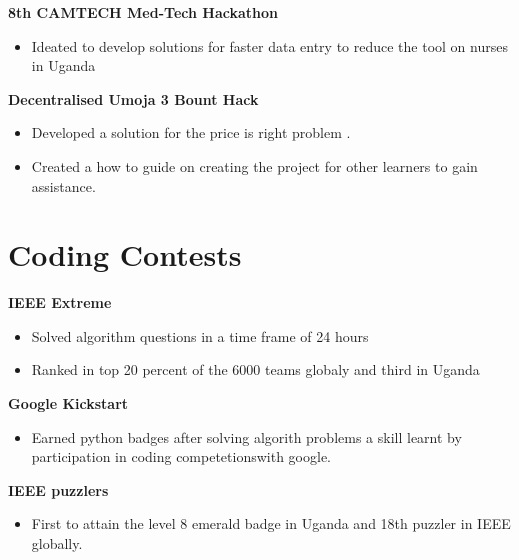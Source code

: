 \documentclass[a4paper,twocolumn]{article}
\begin{document}
        {\bf 8th CAMTECH Med-Tech Hackathon}
        \begin{itemize}
            \itemsep0em
            \item Ideated to develop solutions for faster data entry to reduce the tool on nurses in Uganda
        \end{itemize}

        {\bf Decentralised Umoja 3 Bount Hack}
        \begin{itemize}
            \itemsep0em
            \item Developed a solution for the price is right problem .
            \item Created a how to guide on creating the project for other learners to gain assistance.
        \end{itemize}
    
    
    
        \section*{\bf Coding Contests}
        {\bf IEEE Extreme}
        \begin{itemize}
            \itemsep0em
            \item  Solved algorithm questions in a time frame of 24 hours
            \item Ranked in top 20 percent of the 6000 teams globaly and third in Uganda
        \end{itemize}

        {\bf Google Kickstart}
        \begin{itemize}
            \item Earned python badges after solving algorith problems a skill learnt by participation in coding competetionswith google.
        \end{itemize}

        {\bf IEEE puzzlers}
        \begin{itemize}
            \item First to attain the level 8 emerald badge in Uganda and 18th puzzler in IEEE globally.
        \end{itemize}
    
\end{document}

